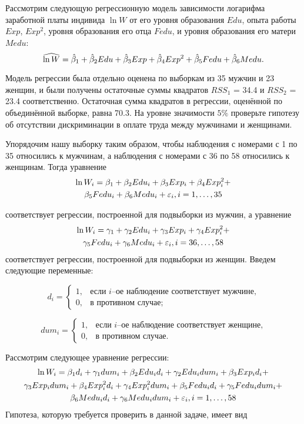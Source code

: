 \begin{problem}  %
 Рассмотрим следующую регрессионную модель зависимости логарифма заработной платы индивида $\ln W$ от его уровня образования $Edu$, опыта работы $Exp$, $Exp^2$, уровня образования его отца $Fedu$, и уровня образования его матери $Medu$:
\[
\widehat{\ln W}=\hat{\beta}_1 + \hat{\beta}_2 Edu + \hat{\beta}_3 Exp + \hat{\beta}_4 Exp^2 + \hat{\beta}_5 Fedu+\hat{\beta}_6 Medu.
\]

Модель регрессии была отдельно оценена по выборкам из 35 мужчин и 23 женщин, и были получены остаточные суммы квадратов $RSS_1$ = 34.4 и $RSS_2$ = 23.4 соответственно. Остаточная сумма квадратов в регрессии, оценённой по объединённой выборке, равна 70.3. На уровне значимости $5\%$ проверьте гипотезу об отсутствии дискриминации в оплате труда между мужчинами и женщинами.


\begin{sol}

Упорядочим нашу выборку таким образом, чтобы наблюдения с номерами с 1 по 35 относились к мужчинам, а наблюдения с номерами с 36 по 58 относились к женщинам.
Тогда уравнение
\begin{multline*}
\ln W_i=\beta_1+\beta_2 Edu_i+\beta_3 Exp_i+\beta_4 Exp_i^2+\\
\beta_5 Fedu_i+\beta_6 Medu_i+\varepsilon_i, i=1, \ldots, 35
\end{multline*}

соответствует регрессии, построенной для подвыборки из мужчин, а уравнение
\begin{multline*}
\ln W_i=\gamma_1+\gamma_2 Edu_i+\gamma_3 Exp_i+\gamma_4 Exp_i^2+\\
\gamma_5 Fedu_i+\gamma_6 Medu_i+\varepsilon_i, i=36, \ldots, 58
\end{multline*}
соответствует регрессии, построенной для подвыборки из женщин. Введем следующие переменные:

\[
d_i =
\begin{cases}
    1, & \text{если $i$--ое наблюдение соответствует мужчине,} \\
    0, & \text{в противном случае;}
\end{cases}
\]

\[
dum_i =
\begin{cases}
    1, & \text{если $i$--ое наблюдение соответствует женщине,} \\
    0, & \text{в противном случае.}
\end{cases}
\]

Рассмотрим следующее уравнение регрессии:
\begin{multline*}
\ln W_i=\beta_1 d_i+\gamma_1 dum_i+\beta_2 Edu_i d_i+\gamma_2
Edu_i dum_i+\beta_3 Exp_i d_i+\\
\gamma_3 Exp_i dum_i+\beta_4 Exp_i^2 d_i + \gamma_4 Exp_i^2 dum_i + \beta_5 Fedu_i d_i +\gamma_5 Fedu_i dum_i+\\
\beta_6 Medu_i d_i+\gamma_6 Medu_i dum_i+\varepsilon_i, i=1, \ldots, 58
\end{multline*}
Гипотеза, которую требуется проверить в данной задаче, имеет вид


\end{sol}
\end{problem}
